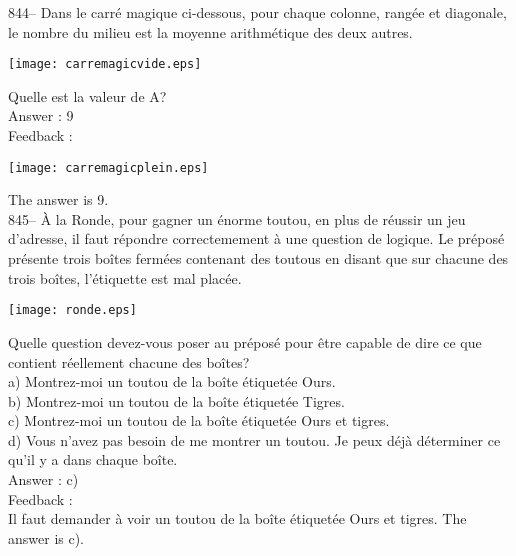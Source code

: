 ﻿\documentclass[letterpaper, 12pt]{article}
\begin{document}
844-- Dans le carr\'e magique ci-dessous, pour chaque colonne, rang\'ee et
diagonale, le nombre du milieu est la moyenne arithm\'etique des deux
autres.    \begin{center}
    \texttt{[image: carremagicvide.eps]}
    \end{center}
Quelle est la valeur de A?\\

Answer : 9\\

Feedback : \\

    \begin{center}
    \texttt{[image: carremagicplein.eps]}
    \end{center}


The answer is 9.\\

845-- \`A la Ronde, pour gagner un \'enorme toutou, en plus de
r\'eussir un jeu d'adresse, il faut r\'epondre correctemement \`a
une question de logique.  Le pr\'epos\'e pr\'esente trois bo\^ites
ferm\'ees contenant des toutous en disant que sur chacune des trois
bo\^ites, l'\'etiquette est mal plac\'ee.
    \begin{center}
    \texttt{[image: ronde.eps]}
    \end{center}
Quelle question devez-vous poser au pr\'epos\'e pour \^etre capable de dire
ce que contient r\'eellement chacune des bo\^ites?\\
a) Montrez-moi un toutou de la bo\^ite \'etiquet\'ee \og Ours\fg .\\
b) Montrez-moi un toutou de la bo\^ite \'etiquet\'ee \og Tigres\fg .\\
c) Montrez-moi un toutou de la bo\^ite \'etiquet\'ee \og Ours et tigres\fg.\\
d) Vous n'avez pas besoin de me montrer un toutou.  Je peux d\'ej\`a
d\'eterminer ce qu'il y a dans chaque bo\^ite.\\

Answer : c)\\

Feedback : \\
Il faut demander \`a voir un toutou de la bo\^ite \'etiquet\'ee \og
Ours et tigres\fg.  The answer is c).\\
\end{document}
